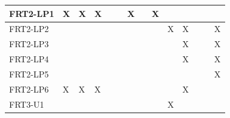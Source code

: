 \documentclass[12pt, titlepage]{article}
\begin{document}
\begin{table}[ht]
{\begin{tabular}{llllllllllllll}
\multicolumn{1}{|l|}{FRT2-LP1}   & \multicolumn{1}{l|}{X}  & \multicolumn{1}{l|}{X}  & \multicolumn{1}{l|}{X}  & \multicolumn{1}{l|}{}  & \multicolumn{1}{l|}{}  & \multicolumn{1}{l|}{X}  & \multicolumn{1}{l|}{}  & \multicolumn{1}{l|}{X}  & \multicolumn{1}{l|}{}  & \multicolumn{1}{l|}{}   & \multicolumn{1}{l|}{}  & \multicolumn{1}{l|}{}   & \multicolumn{1}{l|}{}   \\ \hline
\multicolumn{1}{|l|}{FRT2-LP2}   & \multicolumn{1}{l|}{}  & \multicolumn{1}{l|}{}  & \multicolumn{1}{l|}{}  & \multicolumn{1}{l|}{}  & \multicolumn{1}{l|}{}  & \multicolumn{1}{l|}{}  & \multicolumn{1}{l|}{}  & \multicolumn{1}{l|}{}  & \multicolumn{1}{l|}{X}  & \multicolumn{1}{l|}{X}   & \multicolumn{1}{l|}{}  & \multicolumn{1}{l|}{}   & \multicolumn{1}{l|}{X}   \\ \hline
\multicolumn{1}{|l|}{FRT2-LP3}   & \multicolumn{1}{l|}{}  & \multicolumn{1}{l|}{}  & \multicolumn{1}{l|}{}  & \multicolumn{1}{l|}{}  & \multicolumn{1}{l|}{}  & \multicolumn{1}{l|}{}  & \multicolumn{1}{l|}{}  & \multicolumn{1}{l|}{}  & \multicolumn{1}{l|}{}  & \multicolumn{1}{l|}{X}   & \multicolumn{1}{l|}{}  & \multicolumn{1}{l|}{}   & \multicolumn{1}{l|}{X}   \\ \hline
\multicolumn{1}{|l|}{FRT2-LP4}   & \multicolumn{1}{l|}{}  & \multicolumn{1}{l|}{}  & \multicolumn{1}{l|}{}  & \multicolumn{1}{l|}{}  & \multicolumn{1}{l|}{}  & \multicolumn{1}{l|}{}  & \multicolumn{1}{l|}{}  & \multicolumn{1}{l|}{}  & \multicolumn{1}{l|}{}  & \multicolumn{1}{l|}{X}   & \multicolumn{1}{l|}{}  & \multicolumn{1}{l|}{}   & \multicolumn{1}{l|}{X}   \\ \hline
\multicolumn{1}{|l|}{FRT2-LP5}   & \multicolumn{1}{l|}{}  & \multicolumn{1}{l|}{}  & \multicolumn{1}{l|}{}  & \multicolumn{1}{l|}{}  & \multicolumn{1}{l|}{}  & \multicolumn{1}{l|}{}  & \multicolumn{1}{l|}{}  & \multicolumn{1}{l|}{}  & \multicolumn{1}{l|}{}  & \multicolumn{1}{l|}{}   & \multicolumn{1}{l|}{}  & \multicolumn{1}{l|}{}   & \multicolumn{1}{l|}{X}   \\ \hline
\multicolumn{1}{|l|}{FRT2-LP6}   & \multicolumn{1}{l|}{X}  & \multicolumn{1}{l|}{X}  & \multicolumn{1}{l|}{X}  & \multicolumn{1}{l|}{}  & \multicolumn{1}{l|}{}  & \multicolumn{1}{l|}{}  & \multicolumn{1}{l|}{}  & \multicolumn{1}{l|}{}  & \multicolumn{1}{l|}{}  & \multicolumn{1}{l|}{X}   & \multicolumn{1}{l|}{}  & \multicolumn{1}{l|}{}   & \multicolumn{1}{l|}{}   \\ \hline
\multicolumn{1}{|l|}{FRT3-U1}    & \multicolumn{1}{l|}{}  & \multicolumn{1}{l|}{}  & \multicolumn{1}{l|}{}  & \multicolumn{1}{l|}{}  & \multicolumn{1}{l|}{}  & \multicolumn{1}{l|}{}  & \multicolumn{1}{l|}{}  & \multicolumn{1}{l|}{}  & \multicolumn{1}{l|}{X}  & \multicolumn{1}{l|}{}   & \multicolumn{1}{l|}{}  & \multicolumn{1}{l|}{}   & \multicolumn{1}{l|}{}   \\ \hline

\end{tabular}}
\end{table}
\end{document}

